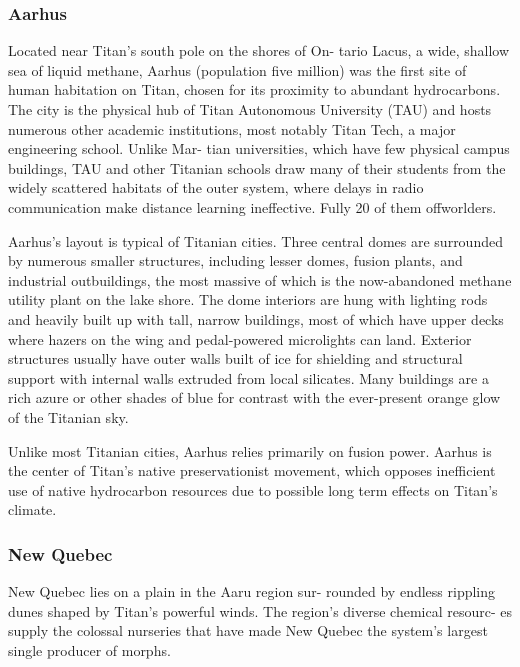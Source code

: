 \subsubsection{Aarhus}

Located near Titan's south pole on the shores of On-
tario Lacus, a wide, shallow sea of liquid methane, 
Aarhus (population five million) was the first site of 
human habitation on Titan, chosen for its proximity 
to abundant hydrocarbons. The city is the physical 
hub of Titan Autonomous University (TAU) and hosts 
numerous other academic institutions, most notably 
Titan Tech, a major engineering school. Unlike Mar-
tian universities, which have few physical campus 
buildings, TAU and other Titanian schools draw 
many of their students from the widely scattered 
habitats of the outer system, where delays in radio 
communication make distance learning ineffective. 
Fully 20%
of them offworlders.

Aarhus's layout is typical of Titanian cities. Three 
central domes are surrounded by numerous smaller 
structures, including lesser domes, fusion plants, and 
industrial outbuildings, the most massive of which is 
the now-abandoned methane utility plant on the lake 
shore. The dome interiors are hung with lighting rods 
and heavily built up with tall, narrow buildings, most 
of which have upper decks where hazers on the wing 
and pedal-powered microlights can land. Exterior 
structures usually have outer walls built of ice for 
shielding and structural support with internal walls 
extruded from local silicates. Many buildings are a 
rich azure or other shades of blue for contrast with 
the ever-present orange glow of the Titanian sky.

Unlike most Titanian cities, Aarhus relies primarily 
on fusion power. Aarhus is the center of Titan's native 
preservationist movement, which opposes inefficient 
use of native hydrocarbon resources due to possible 
long term effects on Titan's climate.

\subsubsection{New Quebec}

New Quebec lies on a plain in the Aaru region sur-
rounded by endless rippling dunes shaped by Titan's 
powerful winds. The region's diverse chemical resourc-
es supply the colossal nurseries that have made New 
Quebec the system's largest single producer of morphs.

